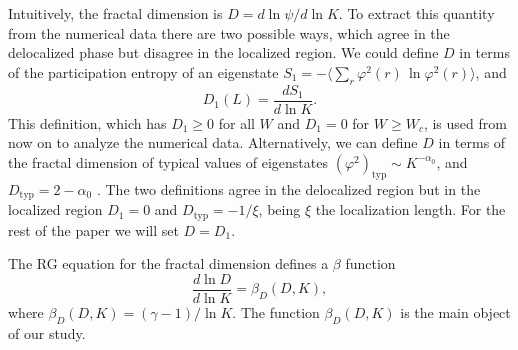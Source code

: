 \documentclass[reprint,aps,prl,superscriptaddress,english,nolongbibliography]{revtex4-2}
\begin{document}
{Intuitively, the fractal dimension is $D=d\ln\psi/d\ln K$. To extract this quantity from the numerical data there are two possible ways, which agree in the delocalized phase but disagree in the localized region. We could define $D$ in terms of the participation entropy of an eigenstate $S_1=-\langle\sum_{r}\varphi^{2}(r)\,\ln \varphi^{2}(r)\rangle$, and
\begin{equation}
\label{eq:fract_dim}
    D_1(L)=\frac{dS_1}{d\ln K}.
\end{equation}
This definition, which has $D_1\geq 0$ for all $W$ and $D_1=0$ for $W\geq W_c$, is used from now on to analyze the numerical data. 
Alternatively, we can define $D$ in terms of the fractal dimension of typical values of eigenstates $(\varphi^2)_{\mathrm{typ}}\sim K^{-\alpha_0}$, and $D_{\mathrm{typ}}=2-\alpha_0$ \cite{kravtsov2018non}. 
The two definitions agree in the delocalized region but in the localized region $D_1=0$ and $D_{\mathrm{typ}}=-1/\xi$,  being $\xi$ the localization length. For the rest of the paper we will set $D=D_1$.

The RG equation for the fractal dimension defines a $\beta$ function
\begin{equation}
    \frac{d\ln D}{d\ln K}=\beta_D(D,K),
\end{equation}
where $\beta_D(D,K)=(\gamma-1)/\ln K$.
The function $\beta_D(D,K)$ is the main object of our study.

}
\end{document}
